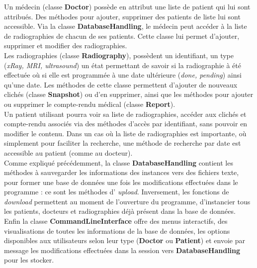 \documentclass[12pt,a4paper]{article}
\begin{document}
\begin{multicols}{2}
		Un médecin (classe \textbf{Doctor}) possède en attribut une liste de patient qui lui sont attribués. Des méthodes pour ajouter, supprimer des patients de liste lui sont accessible. Via la classe \textbf{DatabaseHandling}, le médecin peut accéder à la liste de radiographies de chacun de ses patients. Cette classe lui permet d'ajouter, supprimer et modifier des radiographies. \\
		
		Les radiographies (classe \textbf{Radiography}), possèdent un identifiant, un type (\textit{xRay, MRI, ultrasound}) un état permettant de savoir si la radiographie à été effectuée où si elle est programmée à une date ultérieure (\textit{done, pending}) ainsi qu'une date. Les méthodes de cette classe permettent d'ajouter de nouveaux clichés (classe \textbf{Snapshot}) ou d'en supprimer, ainsi que les méthodes pour ajouter ou supprimer le compte-rendu médical (classe \textbf{Report}). \\
		
		Un patient utilisant pourra voir sa liste de radiographies, accéder aux clichés et compte-rendu associés via des méthodes d'accès par identifiant, sans pouvoir en modifier le contenu. Dans un cas où la liste de radiographies est importante, où simplement pour faciliter la recherche, une méthode de recherche par date est accessible au patient (comme au docteur). \\
		
		Comme expliqué précédemment, la classe \textbf{DatabaseHandling} contient les méthodes à sauvegarder les informations des instances vers des fichiers texte, pour former une base de données une fois les modifications effectuées dans le programme : ce sont les méthodes d' \og \textit{upload}\fg{}. Inversement, les fonctions de \og \textit{download}\fg{} permettent au moment de l'ouverture du programme, d'instancier tous les patients, docteurs et radiographies déjà présent dans la base de données. \\
		
		Enfin la classe \textbf{CommandLineInterface} offre des menus interactifs, des visualisations de toutes les informations de la base de données, les options disponibles aux utilisateurs selon leur type (\textbf{Doctor} ou \textbf{Patient}) et envoie par \og message\fg{} les modifications effectuées dans la \og session\fg{} vers \textbf{DatabaseHandling} pour les stocker. \\
		
	\end{multicols}
\end{document}
